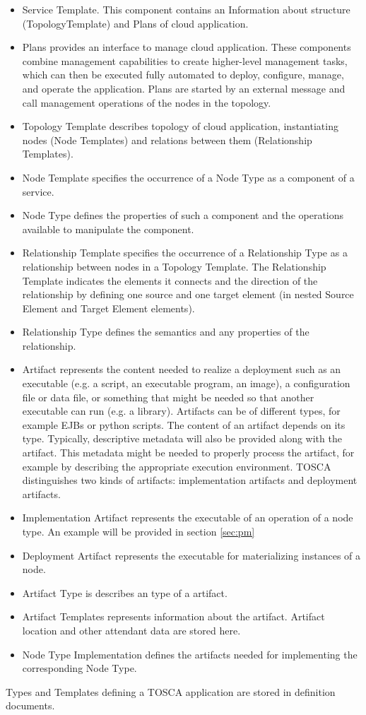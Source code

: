 \begin{itemize}
\item Service Template. 
	This component contains an Information about structure (TopologyTemplate) and Plans of cloud application.
\item Plans provides an interface to manage cloud application.
These components combine management capabilities to create higher-level management tasks, which can then be executed fully automated to deploy, configure, manage, and operate the application.
Plans are started by an external message and call management operations of the nodes in the topology.
\item Topology Template describes topology of cloud application, instantiating nodes (Node Templates) and relations between them (Relationship Templates).
\item Node Template specifies the occurrence of a Node Type as a component of a service.
\item Node Type defines the properties of such a component and the operations available to manipulate the component.
\item Relationship Template specifies the occurrence of a Relationship Type as a relationship between nodes in a Topology Template. 
	The Relationship Template indicates the elements it connects and the direction of the relationship by defining one source and one target element (in nested Source Element and Target Element elements).
\item Relationship Type defines the semantics and any properties of the relationship. 
\item Artifact  represents the content needed to realize a deployment such as an executable (e.g. a script, an executable program, an image), a configuration file or data file, or something that might be needed so that another executable can run (e.g. a library).
	Artifacts can be of different types, for example EJBs or python scripts.
	The content of an artifact depends on its type. 
	Typically, descriptive metadata will also be provided along with the artifact.
	This metadata might be needed to properly process the artifact, for example by describing the appropriate execution environment.
	TOSCA distinguishes two kinds of artifacts: implementation artifacts and deployment artifacts.
\item Implementation Artifact represents the executable of an operation of a node type. An example will be provided in section \ref{sec:pm}
\item Deployment Artifact represents the executable for materializing instances of a node.
\item Artifact Type is describes an type of a artifact.
\item Artifact Templates represents information about the artifact. 
	Artifact location and other attendant data are stored here.
\item Node Type Implementation defines the artifacts needed for implementing the corresponding Node Type.
\end{itemize}
Types and Templates defining a TOSCA application are stored in definition documents.

